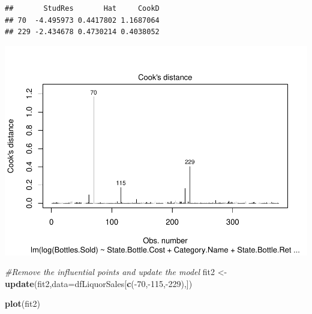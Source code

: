 \documentclass[]{elsarticle} %
\makeatletter
\newenvironment{Shaded}{\begin{snugshade}}{\end{snugshade}}
\newcommand{\KeywordTok}[1]{\textcolor[rgb]{0.13,0.29,0.53}{\textbf{{#1}}}}
\newcommand{\DataTypeTok}[1]{\textcolor[rgb]{0.13,0.29,0.53}{{#1}}}
\newcommand{\DecValTok}[1]{\textcolor[rgb]{0.00,0.00,0.81}{{#1}}}
\newcommand{\StringTok}[1]{\textcolor[rgb]{0.31,0.60,0.02}{{#1}}}
\newcommand{\CommentTok}[1]{\textcolor[rgb]{0.56,0.35,0.01}{\textit{{#1}}}}
\newcommand{\NormalTok}[1]{{#1}}
\def\maxwidth{\ifdim\Gin@nat@width>\linewidth\linewidth
\else\Gin@nat@width\fi}
\let\Oldincludegraphics\includegraphics
\renewcommand{\includegraphics}[1]{\Oldincludegraphics[width=\maxwidth]{#1}}
\makeatother
\begin{document}
\begin{verbatim}
##       StudRes       Hat     CookD
## 70  -4.495973 0.4417802 1.1687064
## 229 -2.434678 0.4730214 0.4038052
\end{verbatim}

\begin{Shaded}
\end{Shaded}

\includegraphics{Final_Project_files/figure-latex/unnamed-chunk-14-2.pdf}

\begin{Shaded}
\begin{Highlighting}[]
\CommentTok{#Remove the influential points and update the model}
\NormalTok{fit2 <-}\StringTok{ }\KeywordTok{update}\NormalTok{(fit2,}\DataTypeTok{data=}\NormalTok{dfLiquorSales[}\KeywordTok{c}\NormalTok{(-}\DecValTok{70}\NormalTok{,-}\DecValTok{115}\NormalTok{,-}\DecValTok{229}\NormalTok{),])}


\KeywordTok{plot}\NormalTok{(fit2)}
\end{Highlighting}
\end{Shaded}
\end{document}
